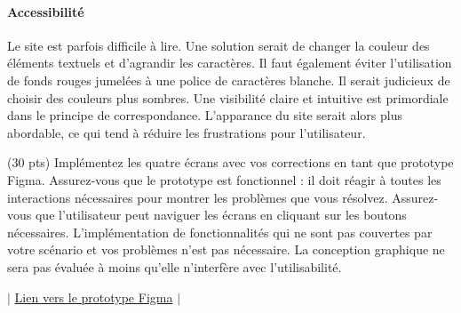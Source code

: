 \documentclass[9pt]{report}
\begin{document}
\begin{multicols*}{2}
\paragraph{Accessibilité}
Le site est parfois difficile à lire. Une solution serait de changer la couleur des éléments textuels et d'agrandir les caractères. Il faut 
également éviter l'utilisation de fonds rouges jumelées à une police de 
caractères blanche. Il serait judicieux de choisir des couleurs plus sombres. Une visibilité claire et intuitive est primordiale dans le principe de correspondance. L'apparance du site serait alors plus abordable, ce qui tend 
à réduire les frustrations pour l’utilisateur.

\begin{Exercice}{(30 pts)}{}
 Implémentez les quatre écrans avec vos corrections en tant que prototype Figma. Assurez-vous
que le prototype est fonctionnel : il doit réagir à toutes les interactions nécessaires pour montrer les
problèmes que vous résolvez. Assurez-vous que l’utilisateur peut naviguer les écrans en cliquant
sur les boutons nécessaires. L’implémentation de fonctionnalités qui ne sont pas couvertes par votre
scénario et vos problèmes n’est pas nécessaire.
La conception graphique ne sera pas évaluée à moins qu’elle n’interfère avec l’utilisabilité.   
\end{Exercice}

\begin{center}
  $\Big|$ \href{https://www.figma.com/proto/ljLKsuKg3fSQsX0puWfWj6/Galactic_Spiritv4?page-id=0%3A1&node-id=2-1062&starting-point-node-id=1%3A32&t=gDC3pM3wJifRLpeM-1&mode=design}{\textcolor{myb}{Lien vers le prototype Figma}} $\Big|$ 
 
\end{center}

\end{multicols*}
\end{document}
